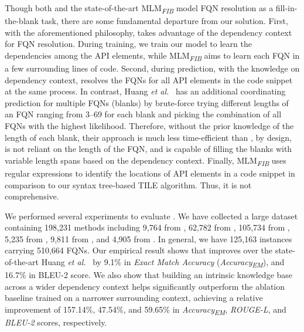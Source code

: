 Though both \tool and the state-of-the-art
MLM\textsubscript{\textit{FIB}} model FQN resolution as a
fill-in-the-blank task, there are some fundamental departure from our
solution. First, with the aforementioned philosophy, {\tool} takes
advantage of the dependency context for FQN resolution. During
training, we train our model to learn the dependencies among the API
elements, while MLM\textsubscript{\textit{FIB}} aims to learn each FQN
in a few surrounding lines of code. Second, during prediction, with
the knowledge on dependency context, {\tool} resolves the FQNs for all
API elements in the code snippet at the same process.  In contrast,
Huang {\em et al.}~\cite{prompt-ase22} has an additional coordinating
prediction for multiple FQNs (blanks) by brute-force trying different
lengths of an FQN ranging from 3--69 for each blank and picking the
combination of all FQNs with the highest likelihood. Therefore,
without the prior knowledge of the length of each blank, their
approach is much less time-efficient than {\tool}, by design, is not
reliant on the length of the FQN, and is capable of filling the blanks
with variable length spans based on the dependency context. Finally,
MLM\textsubscript{\textit{FIB}} uses regular expressions to identify
the locations of API elements in a code snippet in comparison to our
syntax tree-based TILE algorithm. Thus, it is not comprehensive.





We performed several experiments to evaluate {\tool}. We have
collected a large dataset containing 198,231 methods including 9,764
from , 62,782 from , 105,734 from
, 5,235 from , 9,811 from
, and 4,905 from .  In general, we have
125,163 instances carrying 510,664 FQNs. Our empirical result shows
that {\tool} improves over the state-of-the-art Huang {\em et
  al.}~\cite{prompt-ase22} by 9.1\% in {\em Exact Match Accuracy} (\textit{Accuracy\textsubscript{EM}}), and
16.7\% in BLEU-2 score. We also show that building an intrinsic knowledge
base across a wider dependency context helps \tool significantly
outperform the ablation baseline trained on a narrower surrounding
context, achieving a relative improvement of 157.14\%, 47.54\%, and
59.65\% in \textit{Accuracy\textsubscript{EM}}, \textit{ROUGE-L}, and
\textit{BLEU-2} scores, respectively.

